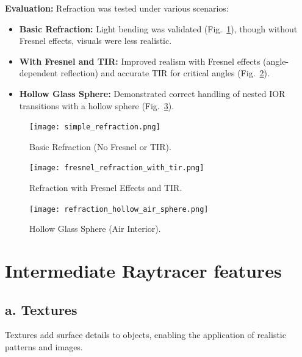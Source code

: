 \documentclass[11pt,a4paper]{article}
\begin{document}
\noindent\textbf{Evaluation:}  
Refraction was tested under various scenarios:  

\begin{itemize}
    \item \textbf{Basic Refraction:} Light bending was validated (Fig.~\ref{fig:basic_refraction}), though without Fresnel effects, visuals were less realistic.  
    \item \textbf{With Fresnel and TIR:} Improved realism with Fresnel effects (angle-dependent reflection) and accurate TIR for critical angles (Fig.~\ref{fig:refraction_fresnel_tir}).  
    \item \textbf{Hollow Glass Sphere:} Demonstrated correct handling of nested IOR transitions with a hollow sphere (Fig.~\ref{fig:hollow_glass_sphere}).  
\end{itemize}

\begin{figure}[h!]  
    \centering  
    \texttt{[image: simple\_refraction.png]}  
    \caption{Basic Refraction (No Fresnel or TIR).}  
    \label{fig:basic_refraction}  
\end{figure}  

\begin{figure}[h!]  
    \centering  
    \texttt{[image: fresnel\_refraction\_with\_tir.png]}  
    \caption{Refraction with Fresnel Effects and TIR.}  
    \label{fig:refraction_fresnel_tir}  
\end{figure}  

\begin{figure}[h!]  
    \centering  
    \texttt{[image: refraction\_hollow\_air\_sphere.png]}  
    \caption{Hollow Glass Sphere (Air Interior).}  
    \label{fig:hollow_glass_sphere}  
\end{figure}  

\section{Intermediate Raytracer features}
\label{sec:intermediate-raytracer}
\subsection{a. Textures}  
\label{sec:textures}

Textures add surface details to objects, enabling the application of realistic patterns and images.
\end{document}
